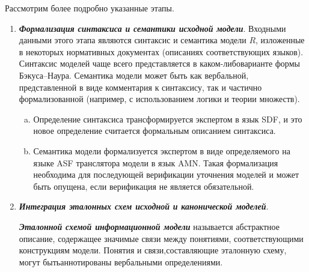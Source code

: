 \begin{multicols}{2}
Рассмотрим более подробно указанные этапы.
\begin{enumerate}[1.]
\item \label{stage:formss}
{\bfseries\textit{Формализация синтаксиса и семантики исходной модели}}.
Входными данными этого этапа являются синтаксис и семантика модели $R$,
изложенные в некоторых нормативных документах (описаниях соответствующих
 языков). Синтаксис моделей
чаще всего представляется в каком-либо\linebreak варианте формы Бэкуса--Наура.
Семантика модели может быть как вербальной, представленной в виде
комментария к синтаксису, так и частич\-но формализованной
(например, с использованием логики и теории множеств).
\begin{enumerate} [(a)]
\item %
\label{stage:sdfsynt}
Определение синтаксиса трансформируется
экспертом в язык SDF, и это новое определение считается формальным описанием синтаксиса.
\item %
\label{stage:amnsem}
Семантика модели формализуется экспертом в виде определяемого на языке ASF
транслятора модели в язык AMN.
Такая формализация необходима для последующей верификации уточнения моделей
и может быть опущена, если верификация не является обязательной.
\end{enumerate}
\item {\bfseries\textit{Интеграция эталонных схем исходной и канонической моделей}}.

{\bfseries\textit{Эталонной схемой информационной модели}} называется
абстрактное описание, содержащее значимые связи между понятиями,
соответ\-ст\-ву\-ющи\-ми конструкциям модели. Понятия и связи,\linebreak составляющие
эталонную схему, могут быть\linebreak аннотированы вербальными определениями.


\end{enumerate}
\end{multicols}

